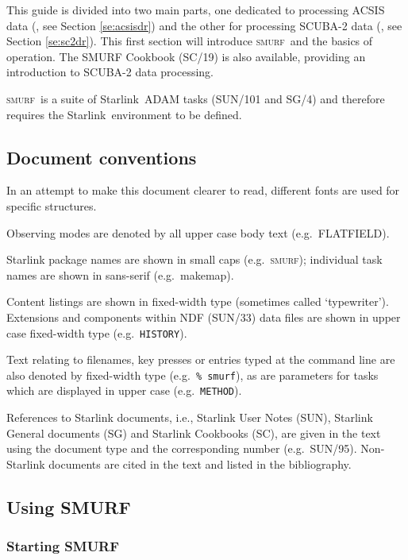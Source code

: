 \documentclass[twoside,11pt]{article}
\newcommand{\htmladdnormallink}[2]{#1}
\newcommand{\xref}[3]{#1}
\renewcommand{\_}{\texttt{\symbol{95}}}
\newcommand{\starlink}{\htmladdnormallink{Starlink}{http://starlink.jach.hawaii.edu}}
\newcommand{\SMURF}{\textsc{smurf}}
\newcommand{\SMURFcook}{\xref{SC/19}{sc19}{}}
\newcommand{\ndfref}{\xref{SUN/33}{sun33}{}}
\newcommand{\task}[1]{\textsf{#1}}
\newcommand{\makemap}{\xref{\task{makemap}}{sun258}{MAKEMAP}}
\newcommand{\aparam}[1]{\texttt{#1}}     %
\newcommand{\ndfcomp}[1]{\texttt{#1}}    %
\begin{document}
This guide is divided into two main parts, one dedicated to processing
ACSIS data (\cite{acsis}, see Section \ref{se:acsisdr}) and the other
for processing SCUBA-2 data (\cite{scuba2}, see Section
\ref{se:sc2dr}). This first section will introduce \SMURF\ and the
basics of operation. The SMURF Cookbook (\SMURFcook) is also
available, providing an introduction to SCUBA-2 data processing.

\SMURF\ is a suite of \starlink\ ADAM tasks (\xref{SUN/101}{sun101}{}
and \xref{SG/4}{sg4}{}) and therefore requires the \starlink\
environment to be defined.

\subsection{Document conventions}

In an attempt to make this document clearer to read, different fonts
are used for specific structures.

Observing modes are denoted by all upper case body text (e.g.\
FLATFIELD).

Starlink package names are shown in small caps (e.g.\ \SMURF);
individual task names are shown in sans-serif (e.g.\ \makemap).

Content listings are shown in fixed-width type (sometimes called
`typewriter'). Extensions and components within NDF (\ndfref) data
files are shown in upper case fixed-width type (e.g.\
\ndfcomp{HISTORY}).

Text relating to filenames, key presses or entries typed at the
command line are also denoted by fixed-width type (e.g.\ \texttt{\%
  smurf}), as are parameters for tasks which are displayed in upper
case (e.g.\ \aparam{METHOD}).

References to Starlink documents, i.e., Starlink User Notes (SUN),
Starlink General documents (SG) and Starlink Cookbooks (SC), are given
in the text using the document type and the corresponding number
(e.g.\ SUN/95). Non-Starlink documents are cited in the text and
listed in the bibliography.

\subsection{Using SMURF}

\subsubsection{Starting SMURF}
\end{document}
